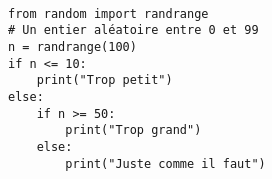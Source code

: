\exer{}
\setcounter{numques}{0}

\begin{lstlisting}

from random import randrange
# Un entier aléatoire entre 0 et 99
n = randrange(100) 
if n <= 10:
    print("Trop petit")
else:
    if n >= 50:
        print("Trop grand")
    else:
        print("Juste comme il faut")
\end{lstlisting}

